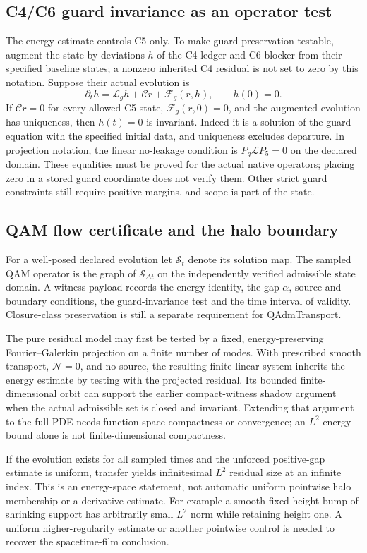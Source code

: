 \documentclass[11pt,a4paper]{article}
\begin{document}
\subsection{C4/C6 guard invariance as an operator test}
The energy estimate controls C5 only. To make guard preservation testable,
augment the state by deviations $h$ of the C4 ledger and C6 blocker from
their specified baseline states; a nonzero inherited C4 residual is not
set to zero by this notation. Suppose their actual evolution is
\[
\partial_t h=\mathcal L_g h+\mathcal C r+\mathcal F_g(r,h),
\qquad h(0)=0.
\]
If $\mathcal C r=0$ for every allowed C5 state, $\mathcal F_g(r,0)=0$,
and the augmented evolution has uniqueness, then $h(t)=0$ is invariant.
Indeed it is a solution of the guard equation with the specified initial
data, and uniqueness excludes departure. In projection notation, the
linear no-leakage condition is $P_g\mathcal L P_5=0$ on the declared domain.
These equalities must be proved for the actual native operators; placing
zero in a stored guard coordinate does not verify them. Other strict guard
constraints still require positive margins, and scope is part of the state.

\subsection{QAM flow certificate and the halo boundary}
For a well-posed declared evolution let $\mathcal S_t$ denote its solution
map. The sampled QAM operator is the graph of $\mathcal S_{\Delta t}$ on
the independently verified admissible state domain. A witness payload records
the energy identity, the gap $\alpha$, source and boundary conditions, the
guard-invariance test and the time interval of validity. Closure-class
preservation is still a separate requirement for QAdmTransport.

The pure residual model may first be tested by a fixed, energy-preserving
Fourier--Galerkin projection on a finite number of modes. With prescribed
smooth transport, $\mathcal N=0$, and no source, the resulting finite linear
system inherits the energy estimate by testing with the projected residual.
Its bounded finite-dimensional orbit can support the earlier compact-witness
shadow argument when the actual admissible set is closed and invariant.
Extending that argument to the full PDE needs function-space compactness or
convergence; an $L^2$ energy bound alone is not finite-dimensional compactness.

If the evolution exists for all sampled times and the unforced positive-gap
estimate is uniform, transfer yields infinitesimal $L^2$ residual size at an
infinite index. This is an energy-space statement, not automatic uniform
pointwise halo membership or a derivative estimate. For example a smooth
fixed-height bump of shrinking support has arbitrarily small $L^2$ norm
while retaining height one. A uniform higher-regularity estimate or another
pointwise control is needed to recover the spacetime-film conclusion.
\end{document}
